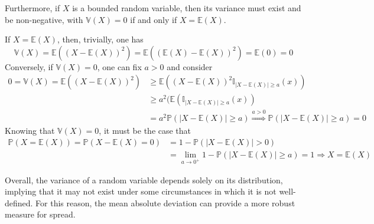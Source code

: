\documentclass{report}
\begin{document}
\noindent Furthermore, if $\displaystyle X$ is a bounded random variable, then its variance must exist and be non-negative, with $\displaystyle \mathbb{V}(X) = 0$ if and only if $\displaystyle X = \mathbb{E}(X)$.
\begin{proofbox}
    If $\displaystyle X = \mathbb{E}(X)$, then, trivially, one has
    \[\mathbb{V}(X) = \mathbb{E}((X - \mathbb{E}(X))^2) = \mathbb{E}((\mathbb{E}(X) - \mathbb{E}(X))^2) = \mathbb{E}(0) = 0\]
    Conversely, if $\displaystyle \mathbb{V}(X) = 0$, one can fix $\displaystyle a > 0$ and consider
    \begin{align*}
        0 = \mathbb{V}(X) = \mathbb{E}((X - \mathbb{E}(X))^2)
            &\ge \mathbb{E}((X - \mathbb{E}(X))^2\mathbb{I}_{|X - \mathbb{E}(X)| \ge a}(x)) \\
            &\ge a^2(\mathbb{E}(\mathbb{I}_{|X - \mathbb{E}(X)| \ge a}(x)) \\
            &= a^2\mathbb{P}(|X - \mathbb{E}(X)| \ge a) \stackrel{a > 0}{\Rightarrow} \mathbb{P}(|X - \mathbb{E}(X)| \ge a) = 0
    \end{align*}
    Knowing that $\displaystyle \mathbb{V}(X) = 0$, it must be the case that
    \begin{align*}
        \mathbb{P}(X = \mathbb{E}(X)) = \mathbb{P}(X - \mathbb{E}(X) = 0)
            &= 1 - \mathbb{P}(|X - \mathbb{E}(X)| > 0) \\
            &= \lim_{a \to 0^+} 1 - \mathbb{P}(|X - \mathbb{E}(X)| \ge a) = 1 \Rightarrow X = \mathbb{E}(X)
    \end{align*}
\end{proofbox}
\noindent Overall, the variance of a random variable depends solely on its distribution, implying that it may not exist under some circumstances in which it is not well-defined. \newline
For this reason, the mean absolute deviation can provide a more robust measure for spread.
\end{document}
